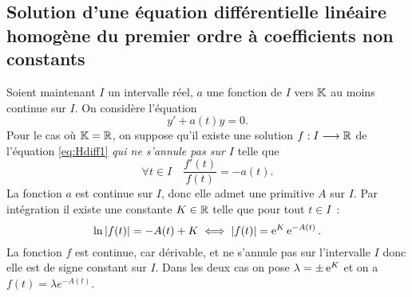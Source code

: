 \subsection[Solution équation homogène coefficients non constants]{Solution d'une équation différentielle linéaire homogène du premier ordre à coefficients non constants}
Soient maintenant \(I\) un intervalle réel, \(a\) une fonction de \(I\) vers \(\mathbb{K}\) au moins continue sur \(I\). On considère l'équation
\begin{equation}
y'+a(t)y=0 \label{eq:Hdiff1}.
\end{equation}
Pour le cas où \(\mathbb{K}=\mathbb{R}\), on suppose qu'il existe une solution \(f:I \longrightarrow \mathbb{R}\) de l'équation \eqref{eq:Hdiff1} \emph{qui ne s'annule pas sur \(I\)} telle que
\begin{equation}
\forall t \in I \quad \frac{f'(t)}{f(t)}=-a(t).
\end{equation}
La fonction \(a\) est continue sur \(I\), donc elle admet une primitive \(A\) sur \(I\). Par intégration il existe une constante \(K \in \mathbb{R}\) telle que pour tout \(t \in I\)~:
\begin{equation}
\ln\left\lvert f(t)\right\rvert=-A(t) +K \iff \left\lvert f(t)\right\rvert=\operatorname{e}^K \operatorname{e}^{-A(t)}.
\end{equation}
La fonction \(f\) est continue, car dérivable, et ne s'annule pas sur l'intervalle \(I\) donc elle est de signe constant sur \(I\). Dans les deux cas on pose \(\lambda=\pm \operatorname{e}^K\) et on a \(f(t)=\lambda e^{-A(t)}\). 

